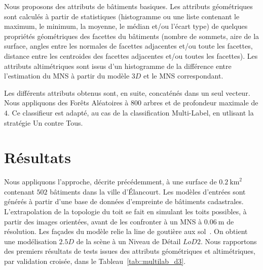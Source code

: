 \documentclass[a4paper,french]{article}
\begin{document}
    Nous proposons des attributs de bâtiments basiques. Les attributs géométriques sont calculés à partir de statistiques (histogramme ou une liste contenant le maximum, le minimum, la moyenne, le médian et/ou l'écart type) de quelques propriétés géométriques des facettes du bâtiments (nombre de sommets, aire de la surface, angles entre les normales de facettes adjacentes et/ou toute les facettes, distance entre les centroides des facettes adjacentes et/ou toutes les facettes). Les attributs altimétriques sont issus d'un histogramme de la différence entre l'estimation du MNS à partir du modèle $3D$ et le MNS correspondant.

    Les différents attributs obtenus sont, en suite, concaténés dans un seul vecteur. Nous appliquons des Forêts Aléatoires à $800$ arbres et de profondeur maximale de $4$. Ce classifieur est adapté, au cas de la classification Multi-Label, en utlisant la stratégie Un contre Tous.

    \section{Résultats}

    Nous appliquons l'approche, décrite précédemment, à une surface de $\SI{0,2}{\km \squared}$ contenant $502$ bâtiments dans la ville d'\'Elancourt. Les modèles d'entrées sont générés à partir d'une base de données d'empreinte de bâtiments cadastrales. L'extrapolation de la topologie du toit se fait en simulant les toits possibles, à partir des images orientées, avant de les confronter à un MNS à $\SI{0,06}{\m}$ de résolution. Les façades du modèle relie la line de goutière aux sol~\cite{Durupt2006}. On obtient une modélisation $2.5D$ de la scène à un Niveau de Détail $LoD 2$. Nous rapportons des premiers résultats de tests issues des attributs géométriques et altimétriques, par validation croisée, dans le Tableau~\ref{tab::multilab_d3}.
\end{document}

